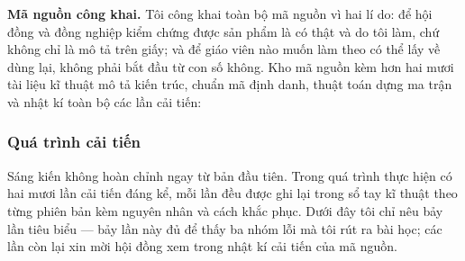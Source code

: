 
\textbf{Mã nguồn công khai.} Tôi công khai toàn bộ mã nguồn vì hai lí do: để
hội đồng và đồng nghiệp kiểm chứng được sản phẩm là có thật và do tôi làm, chứ
không chỉ là mô tả trên giấy; và để giáo viên nào muốn làm theo có thể lấy về
dùng lại, không phải bắt đầu từ con số không. Kho mã nguồn kèm hơn hai mươi tài
liệu kĩ thuật mô tả kiến trúc, chuẩn mã định danh, thuật toán dựng ma trận và
nhật kí toàn bộ các lần cải tiến:


\subsubsection{Quá trình cải tiến}

Sáng kiến không hoàn chỉnh ngay từ bản đầu tiên. Trong quá trình thực hiện có
hai mươi lần cải tiến đáng kể, mỗi lần đều được ghi lại trong sổ tay kĩ thuật
theo từng phiên bản kèm nguyên nhân và cách khắc phục. Dưới đây tôi chỉ nêu bảy
lần tiêu biểu --- bảy lần này đủ để thấy ba nhóm lỗi mà tôi rút ra bài học; các
lần còn lại xin mời hội đồng xem trong nhật kí cải tiến của mã nguồn.

